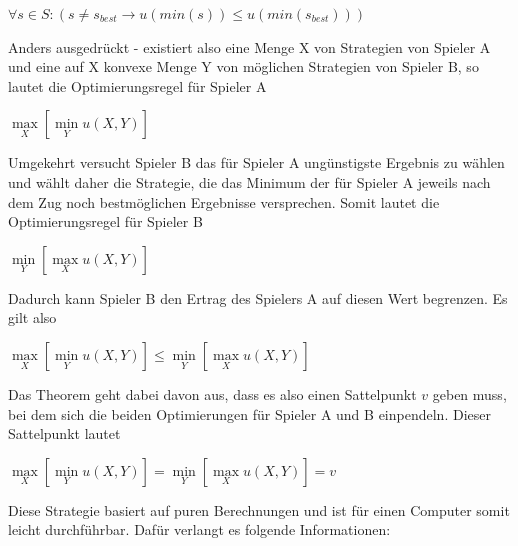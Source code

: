 $ \forall s \in S : (s \neq s_{best} \rightarrow u(min(s)) \leq u(min(s_{best})))$

Anders ausgedrückt - existiert also eine Menge X von Strategien von Spieler A und eine auf X konvexe Menge Y von möglichen Strategien von Spieler B, so lautet die Optimierungsregel für Spieler A

$\max\limits_X[\min\limits_Yu(X,Y)]$

Umgekehrt versucht Spieler B das für Spieler A ungünstigste Ergebnis zu wählen und wählt daher die Strategie, die das Minimum der für Spieler A jeweils nach dem Zug noch bestmöglichen Ergebnisse versprechen. Somit lautet die Optimierungsregel für Spieler B

$\min\limits_Y[\max\limits_Xu(X,Y)]$


Dadurch kann Spieler B den Ertrag des Spielers A auf diesen Wert begrenzen. Es gilt also

$\max\limits_X[\min\limits_Yu(X,Y)] \leq \min\limits_Y[\max\limits_Xu(X,Y)]$

Das Theorem geht dabei davon aus, dass es also einen Sattelpunkt $v$ geben muss, bei dem sich die beiden Optimierungen für Spieler A und B einpendeln. Dieser Sattelpunkt lautet

$\max\limits_X[\min\limits_Yu(X,Y)] = \min\limits_Y[\max\limits_Xu(X,Y)] = v$

Diese Strategie basiert auf puren Berechnungen und ist für einen Computer somit leicht durchführbar. Dafür verlangt es folgende Informationen:


